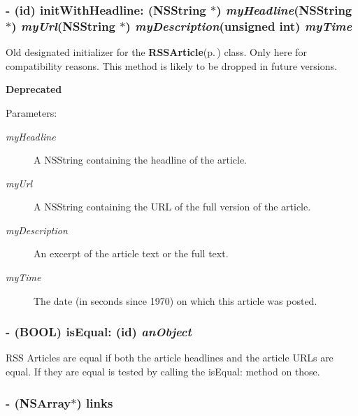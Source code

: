 \subsubsection{\setlength{\rightskip}{0pt plus 5cm}- (id) init\-With\-Headline: (NSString $\ast$) {\em my\-Headline}(NSString $\ast$) {\em my\-Url}(NSString $\ast$) {\em my\-Description}(unsigned int) {\em my\-Time}}\label{interfaceRSSArticle_2bec46ce7a4c7520d9d2b353f30c13d8}


Old designated initializer for the {\bf RSSArticle}{\rm (p.\,\pageref{interfaceRSSArticle})} class. Only here for compatibility reasons. This method is likely to be dropped in future versions. \begin{Desc}
\item[{\bf Deprecated}]\end{Desc}
\begin{Desc}
\item[Parameters:]
\begin{description}
\item[{\em my\-Headline}]A NSString containing the headline of the article. \item[{\em my\-Url}]A NSString containing the URL of the full version of the article. \item[{\em my\-Description}]An excerpt of the article text or the full text. \item[{\em my\-Time}]The date (in seconds since 1970) on which this article was posted. \end{description}
\end{Desc}
\subsubsection{\setlength{\rightskip}{0pt plus 5cm}- (BOOL) is\-Equal: (id) {\em an\-Object}}\label{interfaceRSSArticle_508fd131595c1ae980cf9e2024641ad1}


RSS Articles are equal if both the article headlines and the article URLs are equal. If they are equal is tested by calling the is\-Equal: method on those. 
\subsubsection{\setlength{\rightskip}{0pt plus 5cm}- (NSArray$\ast$) links }\label{interfaceRSSArticle_6f458ddf4bceb58db46ac1c6c723b337}


